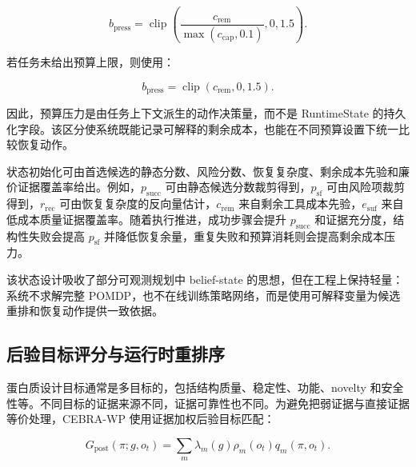 \begin{equation}
b_{\mathrm{press}}
=\operatorname{clip}\left(
\frac{c_{\mathrm{rem}}}{\max(c_{\mathrm{cap}},0.1)},
0,1.5
\right).
\end{equation}

\begin{symboldefs}
\end{symboldefs}

若任务未给出预算上限，则使用：

\begin{equation}
b_{\mathrm{press}}
=\operatorname{clip}(c_{\mathrm{rem}},0,1.5).
\end{equation}

因此，预算压力是由任务上下文派生的动作决策量，而不是 RuntimeState
的持久化字段。该区分使系统既能记录可解释的剩余成本，也能在不同预算设置下统一比较恢复动作。

状态初始化可由首选候选的静态分数、风险分数、恢复复杂度、剩余成本先验和廉价证据覆盖率给出。例如，$p_{\mathrm{succ}}$
可由静态候选分数裁剪得到，$p_{\mathrm{sf}}$
可由风险项裁剪得到，$r_{\mathrm{rec}}$
可由恢复复杂度的反向量估计，$c_{\mathrm{rem}}$
来自剩余工具成本先验，$e_{\mathrm{suf}}$
来自低成本质量证据覆盖率。随着执行推进，成功步骤会提升
$p_{\mathrm{succ}}$ 和证据充分度，结构性失败会提高
$p_{\mathrm{sf}}$
并降低恢复余量，重复失败和预算消耗则会提高剩余成本压力。

该状态设计吸收了部分可观测规划中 belief-state
的思想\citep{kaelbling1998pomdp}，但在工程上保持轻量：系统不求解完整
POMDP，也不在线训练策略网络，而是使用可解释变量为候选重排和恢复动作提供一致依据。

\subsection{后验目标评分与运行时重排序}\label{ux540eux9a8cux76eeux6807ux8bc4ux5206ux4e0eux8fd0ux884cux65f6ux91cdux6392ux5e8f}

蛋白质设计目标通常是多目标的，包括结构质量、稳定性、功能、novelty
和安全性等。不同目标的证据来源不同，证据可靠性也不同。为避免把弱证据与直接证据等价处理，CEBRA-WP
使用证据加权后验目标匹配：

\begin{equation}
G_{\mathrm{post}}(\pi;g,o_t)
=\sum_m \lambda_m(g)\rho_m(o_t)q_m(\pi,o_t).
\end{equation}

\begin{symboldefs}
\end{symboldefs}

